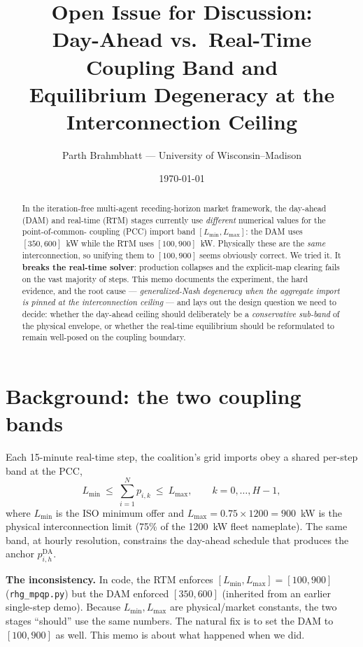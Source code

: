 \documentclass[11pt, letterpaper]{article}
\title{\textbf{Open Issue for Discussion:\\ Day-Ahead vs.\ Real-Time Coupling Band and\\
Equilibrium Degeneracy at the Interconnection Ceiling}}
\author{Parth Brahmbhatt --- University of Wisconsin--Madison}
\date{\today}
\begin{document}
\maketitle

\begin{abstract}
In the iteration-free multi-agent receding-horizon market framework, the day-ahead (DAM) and
real-time (RTM) stages currently use \emph{different} numerical values for the point-of-common-
coupling (PCC) import band $[L_{\min},L_{\max}]$: the DAM uses $[350,600]$~kW while the RTM uses
$[100,900]$~kW. Physically these are the \emph{same} interconnection, so unifying them to
$[100,900]$ seems obviously correct. We tried it. It \textbf{breaks the real-time solver}:
production collapses and the explicit-map clearing fails on the vast majority of steps. This memo
documents the experiment, the hard evidence, and the root cause --- \emph{generalized-Nash
degeneracy when the aggregate import is pinned at the interconnection ceiling} --- and lays out the
design question we need to decide: whether the day-ahead ceiling should deliberately be a
\emph{conservative sub-band} of the physical envelope, or whether the real-time equilibrium should
be reformulated to remain well-posed on the coupling boundary.
\end{abstract}

\section{Background: the two coupling bands}
Each 15-minute real-time step, the coalition's grid imports obey a shared per-step band at the PCC,
\begin{equation}\label{eq:coup}
  L_{\min}\ \le\ \sum_{i=1}^{N} p_{i,k}\ \le\ L_{\max},\qquad k=0,\dots,H-1,
\end{equation}
where $L_{\min}$ is the ISO minimum offer and $L_{\max}=0.75\times1200=900$~kW is the physical
interconnection limit (75\% of the 1200~kW fleet nameplate). The same band, at hourly resolution,
constrains the day-ahead schedule that produces the anchor $p^{\mathrm{DA}}_{i,h}$.

\textbf{The inconsistency.} In code, the RTM enforces $[L_{\min},L_{\max}]=[100,900]$
(\texttt{rhg\_mpqp.py}) but the DAM enforced $[350,600]$ (inherited from an earlier single-step
demo). Because $L_{\min},L_{\max}$ are physical/market constants, the two stages ``should'' use the
same numbers. The natural fix is to set the DAM to $[100,900]$ as well. This memo is about what
happened when we did.
\end{document}
